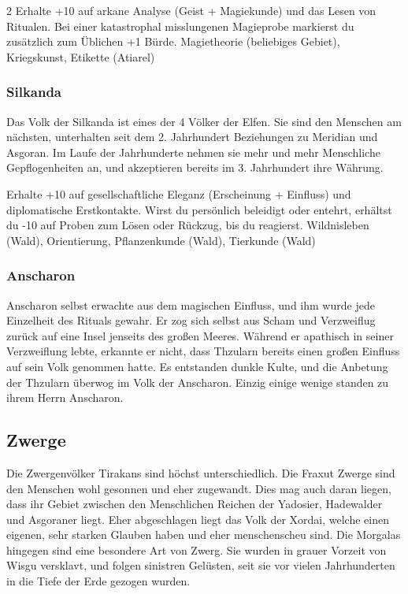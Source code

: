 {\begin{multicols*}{2}
        \abstammungspielwertebox
        {Erhalte +10 auf arkane Analyse (Geist + Magiekunde) und das Lesen von Ritualen.}
        {Bei einer katastrophal misslungenen Magieprobe markierst du zusätzlich zum Üblichen +1 Bürde.}
        {Magietheorie (beliebiges Gebiet), Kriegskunst, Etikette (Atiarel)}

        \subsubsection*{Silkanda}
        Das Volk der Silkanda ist eines der 4 Völker der Elfen. Sie sind den Menschen am nächsten, unterhalten seit dem 2. Jahrhundert Beziehungen zu Meridian und Asgoran. Im Laufe der Jahrhunderte nehmen sie mehr und mehr Menschliche Gepflogenheiten an, und akzeptieren bereits im 3. Jahrhundert ihre Währung.

        \abstammungspielwertebox
        {Erhalte +10 auf gesellschaftliche Eleganz (Erscheinung + Einfluss) und diplomatische Erstkontakte.}
        {Wirst du persönlich beleidigt oder entehrt, erhältst du -10 auf Proben zum Lösen oder Rückzug, bis du reagierst.}
        {Wildnisleben (Wald), Orientierung, Pflanzenkunde (Wald), Tierkunde (Wald)}

        \subsubsection*{Anscharon}
        Anscharon selbst erwachte aus dem magischen Einfluss, und ihm wurde jede Einzelheit des Rituals gewahr. Er zog sich selbst aus Scham und Verzweiflug zurück auf eine Insel jenseits des großen Meeres. Während er apathisch in seiner Verzweiflung lebte, erkannte er nicht, dass Thzularn bereits einen großen Einfluss auf sein Volk genommen hatte. Es entstanden dunkle Kulte, und die Anbetung der Thzularn überwog im Volk der Anscharon. Einzig einige wenige standen zu ihrem Herrn Anscharon.

        \subsection{Zwerge}\label{subsec:abstammungen-zwerge}

        Die Zwergenvölker Tirakans sind höchst unterschiedlich. Die Fraxut Zwerge sind den Menschen wohl gesonnen und eher zugewandt. Dies mag auch daran liegen, dass ihr Gebiet zwischen den Menschlichen Reichen der Yadosier, Hadewalder und Asgoraner liegt. Eher abgeschlagen liegt das Volk der Xordai, welche einen eigenen, sehr starken Glauben haben und eher menschenscheu sind. Die Morgalas hingegen sind eine besondere Art von Zwerg. Sie wurden in grauer Vorzeit von Wisgu versklavt, und folgen sinistren Gelüsten, seit sie vor vielen Jahrhunderten in die Tiefe der Erde gezogen wurden.


\end{multicols*}}
